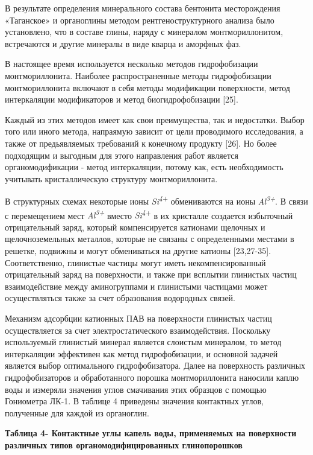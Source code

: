 В результате определения минерального состава бентонита месторождения
«Таганское» и органоглины методом рентгеноструктурного анализа было
установлено, что в составе глины, наряду с минералом монтмориллонитом,
встречаются и другие минералы в виде кварца и аморфных фаз.

В настоящее время используется несколько методов гидрофобизации
монтмориллонита. Наиболее распространенные методы гидрофобизации
монтмориллонита включают в себя методы модификации поверхности, метод
интеркаляции модификаторов и метод биогидрофобизации {[}25{]}.

Каждый из этих методов имеет как свои преимущества, так и недостатки.
Выбор того или иного метода, напраямую зависит от цели проводимого
исследования, а также от предьявляемых требований к конечному продукту
{[}26{]}. Но более подходящим и выгодным для этого направления работ
является органомодификации - метод интеркаляции, потому как, есть
необходимость учитывать кристаллическую структуру монтмориллонита.

В структурных схемах некоторые ионы
\emph{Si\textsuperscript{4}}\textsuperscript{+} обмениваются на ионы
\emph{Al\textsuperscript{3+}}. В связи с перемещением мест
\emph{Al\textsuperscript{3+}} вместо
\emph{Si\textsuperscript{4}}\textsuperscript{+} в их кристалле создается
избыточный отрицательный заряд, который компенсируется катионами
щелочных и щелочноземельных металлов, которые не связаны с определенными
местами в решетке, подвижны и могут обмениваться на другие катионы
{[}23,27-35{]}. Соответственно, глинистые частицы могут иметь
некомпенсированный отрицательный заряд на поверхности, и также при
всплытии глинистых частиц взаимодействие между аминогруппами и
глинистыми частицами может осуществляться также за счет образования
водородных связей.

Механизм адсорбции катионных ПАВ на поверхности глинистых частиц
осуществляется за счет электростатического взаимодействия. Поскольку
используемый глинистый минерал является слоистым минералом, то метод
интеркаляции эффективен как метод гидрофобизации, и основной задачей
является выбор оптимального гидрофобизатора. Далее на поверхность
различных гидрофобизаторов и обработанного порошка монтмориллонита
наносили каплю воды и измеряли значения углов смачивания этих образцов с
помощью Гониометра ЛК-1. В таблице 4 приведены значения контактных
углов, полученные для каждой из органоглин.

{\bfseries Таблица 4- Контактные углы капель воды, применяемых на
поверхности различных типов органомодифицированных глинопорошков}

